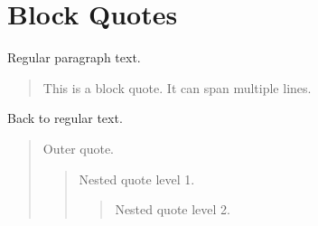 \documentclass{article}
\begin{document}
\section{Block Quotes}

Regular paragraph text.

\begin{quote}
This is a block quote.
It can span multiple lines.
\end{quote}

Back to regular text.

\begin{quote}
Outer quote.
\begin{quote}
Nested quote level 1.
\begin{quote}
Nested quote level 2.
\end{quote}
\end{quote}
\end{quote}
\end{document}
